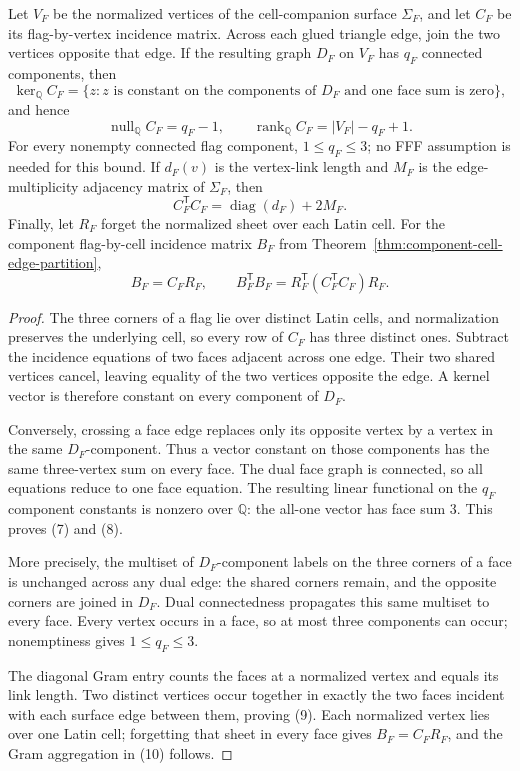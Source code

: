 \begin{theorem}
\label{thm:normalized-cell-rank}
Let $V_F$ be the normalized vertices of the cell-companion surface
$\Sigma_F$, and let $C_F$ be its flag-by-vertex incidence matrix.  Across
each glued triangle edge, join the two vertices opposite that edge.  If the
resulting graph $D_F$ on $V_F$ has $q_F$ connected components, then
\[
 \ker_{\mathbb Q}C_F
 =\{z:\text{$z$ is constant on the components of $D_F$ and one face
 sum is zero}\},                                      \tag{7}
\]
and hence
\[
 \operatorname{null}_{\mathbb Q}C_F=q_F-1,
 \qquad
 \operatorname{rank}_{\mathbb Q}C_F=|V_F|-q_F+1.       \tag{8}
\]
For every nonempty connected flag component, $1\leq q_F\leq3$; no FFF
assumption is needed for this bound.
If $d_F(v)$ is the vertex-link length and $M_F$ is the edge-multiplicity
adjacency matrix of $\Sigma_F$, then
\[
 C_F^{\mathsf T}C_F=\operatorname{diag}(d_F)+2M_F.      \tag{9}
\]
Finally, let $R_F$ forget the normalized sheet over each Latin cell.  For the
component flag-by-cell incidence matrix $B_F$ from
Theorem~\ref{thm:component-cell-edge-partition},
\[
 B_F=C_FR_F,
 \qquad
 B_F^{\mathsf T}B_F
 =R_F^{\mathsf T}(C_F^{\mathsf T}C_F)R_F.              \tag{10}
\]
\end{theorem}

\begin{proof}
The three corners of a flag lie over distinct Latin cells, and normalization
preserves the underlying cell, so every row of $C_F$ has three distinct
ones.  Subtract the incidence equations of two faces adjacent across one
edge.  Their two shared vertices cancel, leaving equality of the two vertices
opposite the edge.  A kernel vector is therefore constant on every component
of $D_F$.

Conversely, crossing a face edge replaces only its opposite vertex by a
vertex in the same $D_F$-component.  Thus a vector constant on those
components has the same three-vertex sum on every face.  The dual face graph
is connected, so all equations reduce to one face equation.  The resulting
linear functional on the $q_F$ component constants is nonzero over
$\mathbb Q$: the all-one vector has face sum $3$.  This proves (7) and (8).

More precisely, the multiset of $D_F$-component labels on the three corners
of a face is unchanged across any dual edge: the shared corners remain,
and the opposite corners are joined in $D_F$.  Dual connectedness propagates
this same multiset to every face.  Every vertex occurs in a face, so at most
three components can occur; nonemptiness gives $1\leq q_F\leq3$.

The diagonal Gram entry counts the faces at a normalized vertex and equals
its link length.  Two distinct vertices occur together in exactly the two
faces incident with each surface edge between them, proving (9).  Each
normalized vertex lies over one Latin cell; forgetting that sheet in every
face gives $B_F=C_FR_F$, and the Gram aggregation in (10) follows.
\end{proof}

